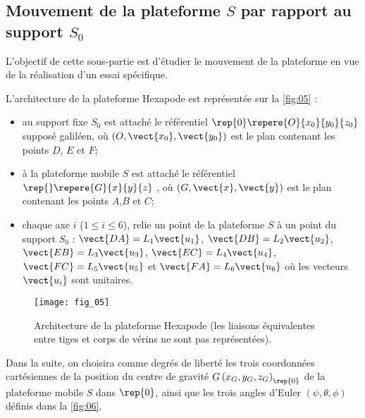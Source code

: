 \subsection{Mouvement de la plateforme $S$ par rapport au support $S_0$}

\begin{obj}
L’objectif de cette sous-partie est d’étudier le mouvement de la plateforme en vue de la réalisation
d’un essai spécifique.
\end{obj}


L’architecture de la plateforme Hexapode est représentée sur la \autoref{fig:05} :
\begin{itemize}	
\item au support fixe $S_0$ est attaché le référentiel $\rep{0}\repere{O}{x_0}{y_0}{z_0}$ supposé galiléen, où $\left(O,\vect{x_0},\vect{y_0}\right)$ est le plan
contenant les points $D$, $E$ et $F$;
\item à la plateforme mobile $S$ est attaché le référentiel $\rep{}\repere{G}{x}{y}{z}$ , où $\left(G,\vect{x},\vect{y}\right)$ est le plan contenant les points
$A$,$B$ et $C$;
\item chaque axe $i$ ($1\leq i \leq 6$), relie un point de la plateforme $S$ à un point du support $S_0$ : $\vect{DA}=L_1\vect{u_1}$,
$\vect{DB}=L_2\vect{u_2}$, 
$\vect{EB}=L_3\vect{u_3}$,
$\vect{EC}=L_4\vect{u_4}$,
$\vect{FC}=L_5\vect{u_5}$ et
$\vect{FA}=L_6\vect{u_6}$ où les vecteurs $\vect{u_i}$ sont unitaires.
\end{itemize}

\begin{figure}[H]
\centering
\texttt{[image: fig\_05]}
\caption{\label{fig:05} Architecture de la plateforme Hexapode (les liaisons équivalentes
entre tiges et corps de vérins ne sont pas représentées). }
\end{figure}

\ifprof
\begin{corrige}
\end{corrige}
\else
\fi

Dans la suite, on choisira comme degrés de liberté les trois coordonnées cartésiennes de la position du centre de
gravité $G\left(x_G,y_G,z_G\right)_{\rep{0}}$ de la plateforme mobile $S$ dans $\rep{0}$, ainsi que les trois angles d’Euler $\left(\psi, \theta, \phi\right)$ définis
dans la \autoref{fig:06}.

